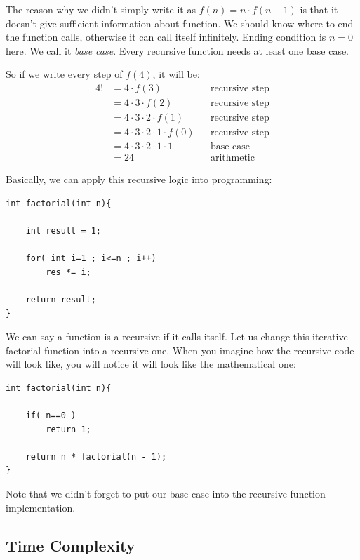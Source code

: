\documentclass[12pt]{article}
\begin{document}
The reason why we didn't simply write it as $f(n) = n \cdot f(n-1)$ is that it doesn't give sufficient information about function. We should know where to end the function calls, otherwise it can call itself infinitely. Ending condition is $n = 0$ here. We call it \emph{base case}. Every recursive function needs at least one base case.

So if we write every step of $f(4)$, it will be:
\begin{align*}
    4!
    &= 4\cdot f(3) && \text{recursive step} \\
    &= 4\cdot 3\cdot f(2) && \text{recursive step} \\
    &= 4\cdot 3\cdot 2\cdot f(1) && \text{recursive step} \\
    &= 4\cdot 3\cdot 2\cdot 1\cdot f(0) && \text{recursive step} \\
    &= 4\cdot 3\cdot 2\cdot 1\cdot 1 && \text{base case} \\
    &= 24 && \text{arithmetic}
\end{align*}

\cleardoublepage
Basically, we can apply this recursive logic into programming:

\begin{verbatim}
int factorial(int n){

    int result = 1;
    
    for( int i=1 ; i<=n ; i++)
        res *= i;
    
    return result;
}
\end{verbatim}

We can say a function is a recursive if it calls itself. Let us change this iterative factorial function into a recursive one. When you imagine how the recursive code will look like, you will notice it will look like the mathematical one:

\begin{verbatim}
int factorial(int n){
    
    if( n==0 )
        return 1;
    
    return n * factorial(n - 1);
}
\end{verbatim}

Note that we didn't forget to put our base case into the recursive function implementation.

\cleardoublepage

\subsection{Time Complexity}
\end{document}
